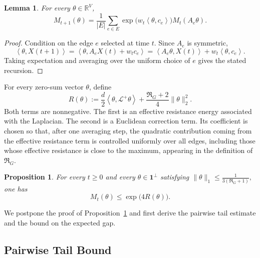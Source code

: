 \documentclass[11pt]{article}
\numberwithin{equation}{section}
\newtheorem{lemma}[theorem]{Lemma}
\newtheorem{proposition}[theorem]{Proposition}
\newcommand{\R}{\mathbb{R}}
\newcommand{\1}{\mathbf{1}}
\newcommand{\ip}[2]{\left\langle #1,#2\right\rangle}
\begin{document}
\begin{lemma}
\label{lem:mgf-recursion}
For every \(\theta\in\R^V\),
\[
M_{t+1}(\theta)
=
\frac1{|E|}
\sum_{e\in E}
\exp\bigl(w_t\ip{\theta}{c_e}\bigr)
M_t(A_e\theta).
\]
\end{lemma}

\begin{proof}
Condition on the edge \(e\) selected at time \(t\). Since \(A_e\) is symmetric,
\[
\ip{\theta}{X(t+1)}
=
\ip{\theta}{A_eX(t)+w_tc_e}
=
\ip{A_e\theta}{X(t)}
+
w_t\ip{\theta}{c_e}.
\]
Taking expectation and averaging over the uniform choice of \(e\) gives the stated recursion.
\end{proof}

For every zero-sum vector \(\theta\), define
\[
R(\theta)
:=
\frac d2\ip{\theta}{\mathcal L^+\theta}
+
\frac{\Re_G+2}{4}\|\theta\|_2^2.
\]
Both terms are nonnegative. The first is an effective resistance energy associated with the Laplacian. The second is a Euclidean correction term. Its coefficient is chosen so that, after one averaging step, the quadratic contribution coming from the effective resistance term is controlled uniformly over all edges, including those whose effective resistance is close to the maximum, appearing in the definition of \(\Re_G\).

\begin{proposition}
\label{prop:mgf-bound}
For every \(t\ge0\) and every \(\theta\in \mathbf 1 ^\perp\) satisfying
\(\|\theta\|_1 \le \frac{1}{3(\Re_G+1)},\) one has
\[
M_t(\theta)
\le
\exp\bigl(4R(\theta)\bigr).
\]
\end{proposition}

We postpone the proof of Proposition~\ref{prop:mgf-bound} and first derive the pairwise tail estimate and the bound on the expected gap.

\subsection{Pairwise Tail Bound}\label{sec:2.2fromMGFBound}
\end{document}
